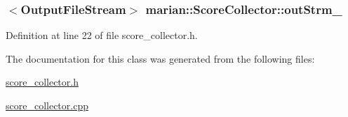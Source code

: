 \subsubsection[{\texorpdfstring{out\+Strm\+\_\+}{outStrm_}}]{$<${\bf Output\+File\+Stream}$>$ marian\+::\+Score\+Collector\+::out\+Strm\+\_\+\hspace{0.3cm}{\ttfamily [protected]}}\hypertarget{classmarian_1_1ScoreCollector_a62fd57793146683d75456f0b18c0966e}{}\label{classmarian_1_1ScoreCollector_a62fd57793146683d75456f0b18c0966e}


Definition at line 22 of file score\+\_\+collector.\+h.



The documentation for this class was generated from the following files\+:\begin{DoxyCompactItemize}
\item 
\hyperlink{score__collector_8h}{score\+\_\+collector.\+h}\item 
\hyperlink{score__collector_8cpp}{score\+\_\+collector.\+cpp}\end{DoxyCompactItemize}
